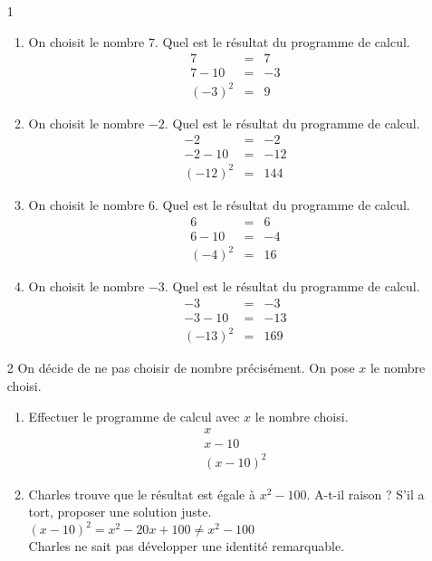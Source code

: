 \documentclass[11pt]{article}
\begin{document}
\begin{enumerate}
\item[1]
  \begin{enumerate}
  \item On choisit le nombre $ 7$. Quel est le résultat du programme de calcul.\\
    \begin{eqnarray*}
	7 &=& 7\\
	7-10 &=& -3\\
	(-3)^2 &=& 9
  \end{eqnarray*}
  \item On choisit le nombre $-2$. Quel est le résultat du programme de calcul.
    \begin{eqnarray*}
	-2 &=& -2\\
	-2-10 &=& -12\\
	(-12)^2 &=& 144
  \end{eqnarray*}  
  \item On choisit le nombre $ 6$. Quel est le résultat du programme de calcul.
    \begin{eqnarray*}
	6 &=& 6\\
	6-10 &=& -4\\
	(-4)^2 &=& 16
  \end{eqnarray*}  
  \item On choisit le nombre $-3$. Quel est le résultat du programme de calcul.
    \begin{eqnarray*}
	-3 &=& -3\\
	-3-10 &=& -13\\
	(-13)^2 &=& 169
  \end{eqnarray*}  
  \end{enumerate}
\item[2] On décide de ne pas choisir de nombre précisément. On pose $x$ le nombre choisi.
  \begin{enumerate}
  \item Effectuer le programme de calcul avec $x$ le nombre choisi.\\
    \begin{eqnarray*}
	x\\
	x-10\\
	(x-10)^2
  \end{eqnarray*}    
  \item Charles trouve que le résultat est égale à $x^2 - 100$. A-t-il raison ? S'il a tort, proposer une solution juste.\\
  $(x-10)^2 = x^2 - 20x + 100 \neq x^2 - 100$\\
  Charles ne sait pas développer une identité remarquable.
  \end{enumerate}
\end{enumerate}
\end{document}
